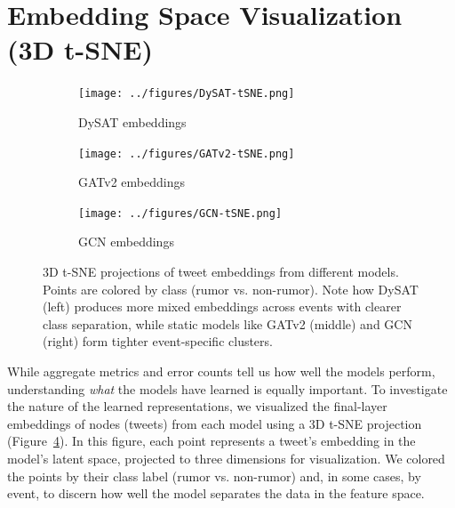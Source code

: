 \documentclass{cshonours}
\begin{document}
\section{Embedding Space Visualization (3D t-SNE)}

\begin{figure}[htbp]
  \centering
  \begin{subfigure}{0.32\textwidth}
    \centering
    \texttt{[image: ../figures/DySAT-tSNE.png]}
    \caption{DySAT embeddings}
    \label{fig:tsne-dysat}
  \end{subfigure}
  \hfill
  \begin{subfigure}{0.32\textwidth}
    \centering
    \texttt{[image: ../figures/GATv2-tSNE.png]}
    \caption{GATv2 embeddings}
    \label{fig:tsne-gatv2}
  \end{subfigure}
  \hfill
  \begin{subfigure}{0.32\textwidth}
    \centering
    \texttt{[image: ../figures/GCN-tSNE.png]}
    \caption{GCN embeddings}
    \label{fig:tsne-gcn}
  \end{subfigure}
  \caption{3D t-SNE projections of tweet embeddings from different models. Points are colored by class (rumor vs. non-rumor). Note how DySAT (left) produces more mixed embeddings across events with clearer class separation, while static models like GATv2 (middle) and GCN (right) form tighter event-specific clusters.}
  \label{fig:tsne_embeddings}
\end{figure}

While aggregate metrics and error counts tell us how well the models perform, understanding \emph{what} the models have learned is equally important. To investigate the nature of the learned representations, we visualized the final-layer embeddings of nodes (tweets) from each model using a 3D t-SNE projection (Figure~\ref{fig:tsne_embeddings}). In this figure, each point represents a tweet's embedding in the model's latent space, projected to three dimensions for visualization. We colored the points by their class label (rumor vs. non-rumor) and, in some cases, by event, to discern how well the model separates the data in the feature space.
\end{document}
